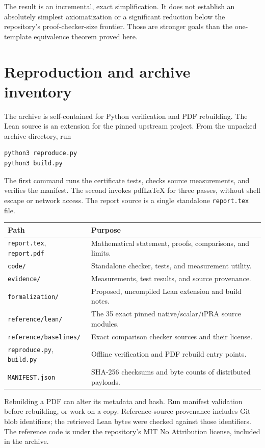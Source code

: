 \documentclass[11pt]{article}
\theoremstyle{definition}\newtheorem{definition}[theorem]{Definition}
\theoremstyle{remark}\newtheorem{remark}[theorem]{Remark}
\begin{document}
The result is an incremental, exact simplification. It does not establish
an absolutely simplest axiomatization or a significant reduction below
the repository's proof-checker-size frontier. Those are stronger goals
than the one-template equivalence theorem proved here.

\appendix
\section{Reproduction and archive inventory}

The archive is self-contained for Python verification and PDF rebuilding.
The Lean source is an extension for the pinned upstream project.
From the unpacked archive directory, run
\begin{lstlisting}
python3 reproduce.py
python3 build.py
\end{lstlisting}
The first command runs the certificate tests, checks source measurements,
and verifies the manifest. The second invokes pdfLaTeX for three passes, without
shell escape or network access. The report source is a single standalone
\texttt{report.tex} file.

\begin{center}
\begin{tabular}{@{}p{}p{}@{}}
\toprule
Path & Purpose\\
\midrule
\texttt{report.tex}, \texttt{report.pdf} & Mathematical statement, proofs, comparisons, and limits.\\
\texttt{code/} & Standalone checker, tests, and measurement utility.\\
\texttt{evidence/} & Measurements, test results, and source provenance.\\
\texttt{formalization/} & Proposed, uncompiled Lean extension and build notes.\\
\texttt{reference/lean/} & The 35 exact pinned native/scalar/iPRA source modules.\\
\texttt{reference/baselines/} & Exact comparison checker sources and their license.\\
\texttt{reproduce.py}, \texttt{build.py} & Offline verification and PDF rebuild entry points.\\
\texttt{MANIFEST.json} & SHA-256 checksums and byte counts of distributed payloads.\\
\bottomrule
\end{tabular}
\end{center}

Rebuilding a PDF can alter its metadata and hash. Run manifest validation
before rebuilding, or work on a copy. Reference-source provenance includes
Git blob identifiers; the retrieved Lean bytes were checked against those
identifiers. The reference code is under the repository's MIT No
Attribution license, included in the archive.
\end{document}
